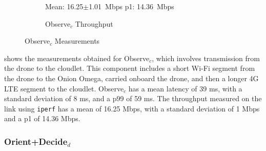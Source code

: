 \begin{figure}[htbp]
\begin{subfigure}[t]{0.45\textwidth}
    \centering
    \small{Mean: 16.25$\pm$1.01~Mbps\; p1: 14.36~Mbps}\\
    \caption{Observe$_{c}$ Throughput}
    \label{fig:observe_c_throughput}
\end{subfigure}
    \caption{Observe$_{c}$ Measurements}
    \label{fig:observe_c_measurements}
\end{figure}

 shows the measurements obtained for
Observe$_c$, which involves transmission from the drone to the cloudlet. This
component includes a short Wi-Fi segment from the drone to the Onion Omega,
carried onboard the drone, and then a longer 4G LTE segment to the cloudlet.
Observe$_c$ has a mean latency of 39 ms, with a standard deviation of 8 ms, and
a p99 of 59 ms. The throughput measured on the link using \texttt{iperf} has a
mean of 16.25 Mbps, with a standard deviation of 1 Mbps and a p1 of 14.36 Mbps.

\subsubsection{Orient+Decide$_d$}

